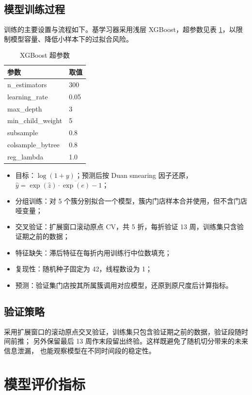 \documentclass[UTF8,a4paper,11pt]{ctexart}
\begin{document}
\subsection{模型训练过程}

训练的主要设置与流程如下。基学习器采用浅层 XGBoost，超参数见表 \ref{tab:xgb}，以限制模型容量、降低小样本下的过拟合风险。

\begin{table}[H]
\centering
\caption{XGBoost 超参数}
\label{tab:xgb}
\small
\begin{tabular}{ll}
\toprule
参数 & 取值 \\
\midrule
n\_estimators & 300 \\
learning\_rate & 0.05 \\
max\_depth & 3 \\
min\_child\_weight & 5 \\
subsample & 0.8 \\
colsample\_bytree & 0.8 \\
reg\_lambda & 1.0 \\
\bottomrule
\end{tabular}
\end{table}

\begin{itemize}[leftmargin=1.6em]
  \item 目标：$\log(1+y)$；预测后按 Duan smearing 因子还原，$\hat{y}=\exp(\hat{z})\cdot\overline{\exp(e)}-1$；
  \item 分组训练：对 5 个簇分别拟合一个模型，簇内门店样本合并使用，但不含门店哑变量；
  \item 交叉验证：扩展窗口滚动原点 CV，共 5 折，每折验证 13 周，训练集只含验证期之前的数据；
  \item 特征缺失：滞后特征在每折内用训练行中位数填充；
  \item 复现性：随机种子固定为 42，线程数设为 1；
  \item 预测：验证集门店按其所属簇调用对应模型，还原到原尺度后计算指标。
\end{itemize}

\subsection{验证策略}

采用扩展窗口的滚动原点交叉验证，训练集只包含验证期之前的数据，验证段随时间前推；
另外保留最后 13 周作末段留出终验。这样既避免了随机切分带来的未来信息泄漏，
也能观察模型在不同时间段的稳定性。

\section{模型评价指标}
\end{document}
